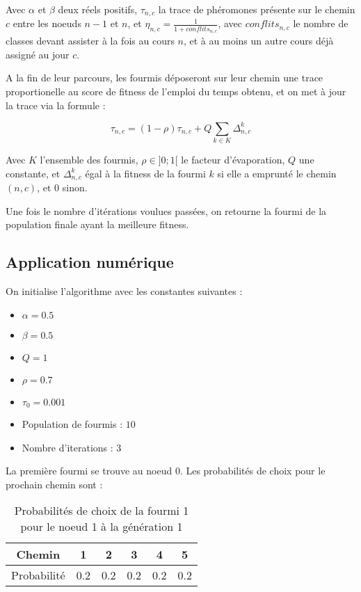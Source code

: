 Avec $\alpha$ et $\beta$ deux réels positifs, $\tau_{n,c}$ la trace de phéromones présente sur le chemin $c$ entre les noeuds $n-1$ et $n$, et $\eta_{n,c} = \frac{1}{1 + conflits_{n,c}}$, avec $conflits_{n,c}$ le nombre de classes devant assister à la fois au cours $n$, et à au moins un autre cours déjà assigné au jour $c$.

A la fin de leur parcours, les fourmis déposeront sur leur chemin une trace proportionelle au score de fitness de l'emploi du temps obtenu, et on met à jour la trace via la formule :

$$\tau_{n,c} = (1-\rho)\tau_{n,c} + Q\sum_{k \in K}{\Delta^k_{n,c}}$$

Avec $K$ l'ensemble des fourmis, $\rho \in ]0;1[$ le facteur d'évaporation, $Q$ une constante, et $\Delta^k_{n,c}$ égal à la fitness de la fourmi $k$ si elle a emprunté le chemin $(n,c)$, et $0$ sinon.

Une fois le nombre d'itérations voulues passées, on retourne la fourmi de la population finale ayant la meilleure fitness.

\subsection{Application numérique}

On initialise l'algorithme avec les constantes suivantes :

\begin{itemize}
    \item $\alpha = 0.5$
    \item $\beta = 0.5$
    \item $Q = 1$
    \item $\rho = 0.7$
    \item $\tau_0 = 0.001$
    \item Population de fourmis : $10$
    \item Nombre d'iterations : $3$
\end{itemize}

La première fourmi se trouve au noeud $0$. Les probabilités de choix pour le prochain chemin sont :


\begin{table}[!h]
    \centering
    \begin{tabular}{|c|c|c|c|c|c|}
        \hline
        Chemin & 1       & 2       & 3       & 4       & 5        \\
        \hline
        Probabilité     & 0.2 & 0.2 & 0.2 & 0.2 & 0.2 \\
        \hline
    \end{tabular}
    \caption{Probabilités de choix de la fourmi 1 pour le noeud 1 à la génération 1}\label{tab:voeux-etudiant}
\end{table}

